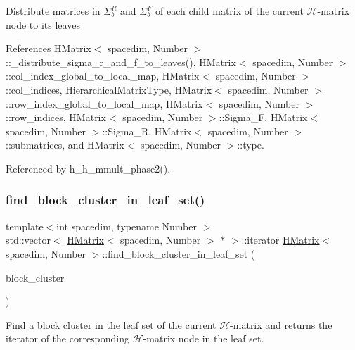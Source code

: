 Distribute matrices in $\Sigma_b^R$ and $\Sigma_b^F$ of each child matrix of the current $\mathcal{H}$-\/matrix node to its leaves

References H\+Matrix$<$ spacedim, Number $>$\+::\+\_\+distribute\+\_\+sigma\+\_\+r\+\_\+and\+\_\+f\+\_\+to\+\_\+leaves(), H\+Matrix$<$ spacedim, Number $>$\+::col\+\_\+index\+\_\+global\+\_\+to\+\_\+local\+\_\+map, H\+Matrix$<$ spacedim, Number $>$\+::col\+\_\+indices, Hierarchical\+Matrix\+Type, H\+Matrix$<$ spacedim, Number $>$\+::row\+\_\+index\+\_\+global\+\_\+to\+\_\+local\+\_\+map, H\+Matrix$<$ spacedim, Number $>$\+::row\+\_\+indices, H\+Matrix$<$ spacedim, Number $>$\+::\+Sigma\+\_\+F, H\+Matrix$<$ spacedim, Number $>$\+::\+Sigma\+\_\+R, H\+Matrix$<$ spacedim, Number $>$\+::submatrices, and H\+Matrix$<$ spacedim, Number $>$\+::type.



Referenced by h\+\_\+h\+\_\+mmult\+\_\+phase2().

\mbox{\label{classHMatrix_ab0f83de878e6079330ec3c374f587a04}} 
\subsubsection{\texorpdfstring{find\+\_\+block\+\_\+cluster\+\_\+in\+\_\+leaf\+\_\+set()}{find\_block\_cluster\_in\_leaf\_set()}\hspace{0.1cm}{\footnotesize\ttfamily [1/2]}}
{\footnotesize\ttfamily template$<$int spacedim, typename Number $>$ \\
std\+::vector$<$ \hyperlink{classHMatrix}{H\+Matrix}$<$ spacedim, Number $>$ $\ast$ $>$\+::iterator \hyperlink{classHMatrix}{H\+Matrix}$<$ spacedim, Number $>$\+::find\+\_\+block\+\_\+cluster\+\_\+in\+\_\+leaf\+\_\+set (\begin{DoxyParamCaption}\item[{const \hyperlink{classBlockCluster}{Block\+Cluster}$<$ spacedim, Number $>$ \&}]{block\+\_\+cluster }\end{DoxyParamCaption})}

Find a block cluster in the leaf set of the current $\mathcal{H}$-\/matrix and returns the iterator of the corresponding $\mathcal{H}$-\/matrix node in the leaf set.


